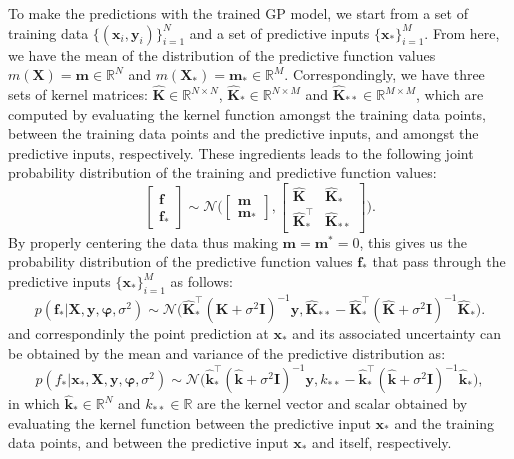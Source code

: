 To make the predictions with the trained GP model, we start from a set of training data $\{(\bm{x}_i,\bm{y}_i)\}_{i=1}^{N}$ and a set of predictive inputs $\{\bm{x}_*\}_{i=1}^M$. From here, we have the mean of the distribution of the predictive function values $m(\bm{X})=\bm{m}\in\mathbb{R}^N$ and $m(\bm{X_*})=\bm{m}_*\in\mathbb{R}^M$. Correspondingly, we have three sets of kernel matrices: $\hat{\bm{K}}\in\mathbb{R}^{N\times N}$, $\hat{\bm{K}}_{*}\in\mathbb{R}^{N\times M}$ and $\hat{\bm{K}}_{**}\in\mathbb{R}^{M\times M}$, which are computed by evaluating the kernel function amongst the training data points, between the training data points and the predictive inputs, and amongst the predictive inputs, respectively. These ingredients leads to the following joint probability distribution of the training and predictive function values:
\begin{equation}    \label{eq:GP_predictive_distribution}
    \begin{bmatrix}\bm{f}\\\bm{f}_*
    \end{bmatrix}\sim\mathcal{N}\bigg(
    \begin{bmatrix}\bm{m}\\\bm{m}_*
    \end{bmatrix},
    \begin{bmatrix}\hat{\bm{K}}&\hat{\bm{K}}_*\\\hat{\bm{K}}_*^\top&\hat{\bm{K}}_{**}
    \end{bmatrix}\bigg).
\end{equation}
By properly centering the data thus making $\bm{m}=\bm{m}^*=0$, this gives us the probability distribution of the predictive function values $\bm{f}_*$ that pass through the predictive inputs $\{\bm{x}_*\}_{i=1}^M$ as follows:
\begin{equation}    \label{eq:GP_predictive_distribution_final}
    p(\bm{f}_*\vert\bm{X},\bm{y},\boldsymbol{\varphi},\sigma^2)\sim\mathcal{N}\Big(\hat{\bm{K}}_*^\top(\hat{\bm{K}}+\sigma^2\bm{I})^{-1}\bm{y},\hat{\bm{K}}_{**}-\hat{\bm{K}}_*^\top(\hat{\bm{K}}+\sigma^2\bm{I})^{-1}\hat{\bm{K}}_*\Big).
\end{equation}
and correspondinly the point prediction at $\bm{x}_*$ and its associated uncertainty can be obtained by the mean and variance of the predictive distribution as:
\begin{equation}    \label{eq:GP_predictive_single_point}
    p(f_*|\bm{x}_*,\bm{X},\bm{y},\boldsymbol{\varphi},\sigma^2)\sim\mathcal{N}\Big(\hat{\bm{k}}_*^\top(\hat{\bm{k}}+\sigma^2\bm{I})^{-1}\bm{y},k_{**}-\hat{\bm{k}}_*^\top(\hat{\bm{k}}+\sigma^2\bm{I})^{-1}\hat{\bm{k}}_*\Big),
\end{equation}
in which $\hat{\bm{k}}_*\in\mathbb{R}^N$ and $k_{**}\in\mathbb{R}$ are the kernel vector and scalar obtained by evaluating the kernel function between the predictive input $\bm{x}_*$ and the training data points, and between the predictive input $\bm{x}_*$ and itself, respectively.


